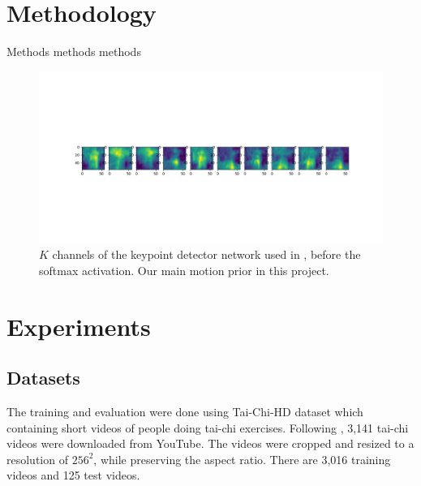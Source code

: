 \documentclass{article}
\begin{document}
\section{Methodology}
Methods
methods
methods
\label{method}
\begin{figure}[ht]
\vskip 0.2in
\begin{center}
\centerline{\includegraphics[width=\columnwidth]{mask_10kp}}
\caption{
$K$ channels of the keypoint detector network used in
\cite{siarohin2020order}, before the softmax activation. Our main motion
prior in this project.
}
\label{mask-10kp}
\end{center}
\vskip -0.2in
\end{figure}
\section{Experiments}
\subsection{Datasets}
The training and evaluation were done using Tai-Chi-HD dataset which containing short videos of people doing tai-chi exercises. Following \cite{siarohin2020order}, 3,141 tai-chi videos were downloaded from YouTube. The videos were cropped and resized to a resolution of $256^2$, while preserving the aspect ratio. There are 3,016 training videos and 125 test videos.
\end{document}
